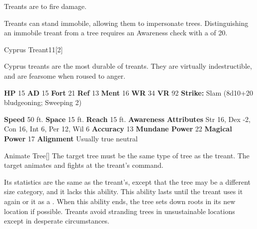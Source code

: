         Treants are  to fire damage.
      
        Treants can stand immobile, allowing them to impersonate trees.
        Distinguishing an immobile treant from a tree requires an Awareness check with a  of 20.
  

  \begin{monsubsection}{Cyprus Treant}{11}[2]
    \vspace{-1em}\vspace{-1em}
    \vspace{0em}

    
          Cyprus treants are the most durable of treants.
          They are virtually indestructible, and are fearsome when roused to anger.
        

    \begin{spellcontent}
      \begin{spelltargetinginfo}
        \pari \textbf{HP} 15 \monsep
          \textbf{AD} 15 \monsep
          \textbf{Fort} 21 \monsep
          \textbf{Ref} 13 \monsep
          \textbf{Ment} 16
        \pari \textbf{WR} 34 \monsep
        \textbf{VR} 92
        \pari \textbf{Strike:}
            Slam  (8d10+20 bludgeoning; Sweeping 2)
      \end{spelltargetinginfo}
    \end{spellcontent}
    \begin{monsterfooter}
      \pari \textbf{Speed} 50 ft. \monsep
        \textbf{Space} 15 ft. \monsep
        \textbf{Reach} 15 ft.
      \pari \textbf{Awareness} 
      \pari \textbf{Attributes}
        Str 16, Dex -2,
        Con 16, Int 6,
        Per 12, Wil 6
      \pari \textbf{Accuracy} 13 \monsep
        \textbf{Mundane Power} 22 \monsep
      \textbf{Magical Power} 17
      \pari \textbf{Alignment} Usually true neutral
    \end{monsterfooter}
  \end{monsubsection}
  \begin{freeability}{Animate Tree}[]
      The target tree must be the same type of tree as the treant.
        The target animates and fights at the treant's command.

        Its statistics are the same as the treant's, except that the tree may be a different size category, and it lacks this ability.
        This ability lasts until the treant uses it again or  it as a .
        When this ability ends, the tree sets down roots in its new location if possible.
        Treants avoid stranding trees in unsustainable locations except in desperate circumstances.
    \end{freeability}
  
